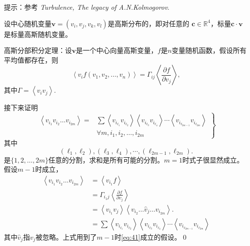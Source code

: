 \documentclass[12pt]{ctexart}
\begin{document}
提示：参考 \emph{Turbulence, The legacy of A.N.Kolmogorov}.\cite{Frisch_Turbulence}

设中心随机变量$\bm{v} = (v_i,v_j,v_k,v_l)$是高斯分布的，即对任意的 $\bm{c}\in \mathbb{R}^4$，标量$\bm{c}\cdot \bm{v}$是标量高斯随机变量。

高斯分部积分定理：设$\bm{v}$是一个中心向量高斯变量，$f$是$n$变量随机函数，假设所有平均值都存在，则
\begin{equation}
	\left\langle v_i f(v_1,v_2,\ldots,v_n)\right\rangle = \Gamma_{ij} \left\langle \frac{\partial f}{\partial v_j}\right\rangle,
\end{equation}
其中$\Gamma=\left\langle v_i v_j\right\rangle $.

接下来证明
\begin{equation}
	\left.\begin{array}{rl}
		\left\langle v_{i_{1}} v_{i_{2}} \ldots v_{i_{2 m}}\right\rangle= & \sum\left\langle v_{i_{\ell_{1}}} v_{i_{\ell_{2}}}\right\rangle\left\langle v_{i_{\ell_{3}}} v_{i_{\ell_{4}}}\right\rangle \cdots\left\langle  v_{i_{\ell_{2m-1 }}} v_{i_{\ell_{2 m}}}\right\rangle \\
		                                                                  & \forall m, i_{1}, i_{2}, \ldots, i_{2 m}
	\end{array}\right\}
	\label{eq:41}
\end{equation}
其中
\begin{equation}
	\left(\ell_{1}, \ell_{2}\right),\left(\ell_{3}, \ell_{4}\right), \cdots,\left(\ell_{2 m-1}, \ell_{2 m}\right).
\end{equation}
是$\{1,2, \ldots, 2 {m}\}$任意的分割，求和是所有可能的分割。$m=1$时式子很显然成立。假设$m-1$时成立，
\begin{equation}
	\begin{aligned}
		\left\langle v_{i_{1}} v_{i_{2}} \ldots v_{i_{2 m}}\right\rangle & = \left\langle v_{i_{1}} f \right\rangle         \\
		                                                                 & =
		\Gamma_{i_1 j} \left\langle \frac{\partial f}{\partial v_j}\right\rangle                                            \\
		                                                                 & =
		\left\langle v_{i_{1}} v_{j}\right\rangle\left\langle v_{i_{2}} \ldots \hat{v}_{j} \ldots v_{i_{2 m}}\right\rangle. \\
		                                                                 & =
		\sum\left\langle v_{i_{\ell_{1}}} v_{i_{\ell_{2}}}\right\rangle\left\langle v_{i_{\ell_{3}}} v_{i_{\ell_{4}}}\right\rangle \cdots\left\langle  v_{i_{\ell_{2m-1 }}} v_{i_{\ell_{2 m}}}\right\rangle\end{aligned}
\end{equation}
其中$\hat{v}_j$指$v_j$被忽略。上式用到了$m-1$时\cref{eq:41}成立的假设。\qed
\end{document}
